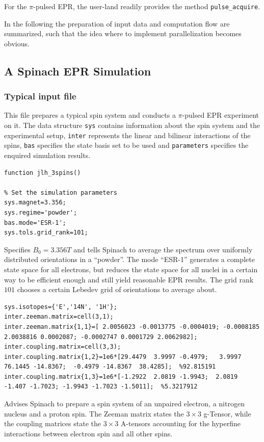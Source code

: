 \documentclass[11.5pt,a4paper]{article}
\begin{document}
For the $\pi$-pulsed EPR, the user-land readily provides the method \verb|pulse_acquire|. 


In the following the preparation of input data and computation flow are summarized, such that the idea where to implement parallelization becomes obvious.

\subsection{A Spinach EPR Simulation}
\subsubsection{Typical input file}
This file prepares a typical spin system and conducts a $\pi$-pulsed EPR experiment on it. The data structure \verb$sys$ contains information about the spin system and the experimental setup, \verb$inter$ represents the linear and bilinear interactions of the spins, \verb$bas$ specifies the state basis set to be used and \verb$parameters$ specifies the enquired simulation results. 
\begin{lstlisting}
function jlh_3spins()

% Set the simulation parameters
sys.magnet=3.356;
sys.regime='powder';
bas.mode='ESR-1';
sys.tols.grid_rank=101;
\end{lstlisting} 
Specifies $B_0 = 3.356 T$ and tells Spinach to average the spectrum over uniformly distributed orientations in a ``powder''. The mode ``ESR-1'' generates a complete state space for all electrons, but reduces the state space for all nuclei in a certain way to be efficient enough and still yield reasonable EPR results. The grid rank $101$ chooses a certain Lebedev grid of orientations to average about.
\begin{lstlisting}[firstnumber=last]
% Interactions
sys.isotopes={'E','14N', '1H'};
inter.zeeman.matrix=cell(3,1);
inter.zeeman.matrix{1,1}=[ 2.0056023 -0.0013775 -0.0004019; -0.0008185 2.0038816 0.0002087; -0.0002747 0.0001729 2.0062982];
inter.coupling.matrix=cell(3,3);
inter.coupling.matrix{1,2}=1e6*[29.4479  3.9997 -0.4979;   3.9997  76.1445 -14.8367;  -0.4979 -14.8367  38.4285];  %92.815191
inter.coupling.matrix{1,3}=1e6*[-1.2922  2.0819 -1.9943;  2.0819  -1.407 -1.7023; -1.9943 -1.7023 -1.5011];  %5.3217912
\end{lstlisting}
Advises Spinach to prepare a spin system of an unpaired electron, a nitrogen nucleus and a proton spin. The Zeeman matrix states the $3\times 3$ g-Tensor, while the coupling matrices state the $3\times 3$ A-tensors accounting for the hyperfine interactions between electron spin and all other spins.
\end{document}

